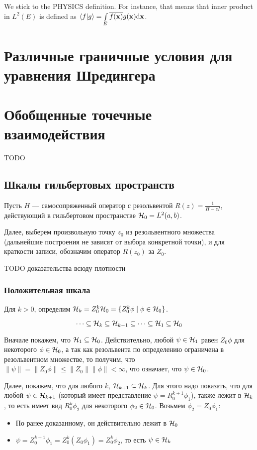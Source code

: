 We stick to the PHYSICS definition. For instance, that means that inner product in $L^2(E)$ is defined as $\ip{f}{g} = \int\limits_E \cconj{f(\vb{x})} g(\vb{x}) \dd \vb{x}$.

\section{Различные граничные условия для уравнения Шредингера}

\section{Обобщенные точечные взаимодействия}
TODO
\subsection{Шкалы гильбертовых пространств}
Пусть $H$ — самосопряженный оператор с резольвентой $R(z) = \frac{1}{H - z I}$, действующий в гильбертовом пространстве $\mathcal{H}_{0} = L^2(a, b)$.

Далее, выберем произвольную точку $z_0$ из резольвентного множества (дальнейшие построения не зависят от выбора конкретной точки), и для краткости записи, обозначим оператор $R(z_0)$ за $Z_0$.


TODO доказательства всюду плотности
\subsubsection{Положительная шкала}
Для $k > 0$, определим $\mathcal{H}_{k} = Z_0^k \mathcal{H}_{0} = \{ Z_0^k \phi \mid \phi \in \mathcal{H}_{0} \}$.

\begin{prop}
\[
\dots \subseteq \mathcal{H}_{k} \subseteq \mathcal{H}_{k - 1} \subseteq \dots \subseteq \mathcal{H}_{1} \subseteq{\mathcal{H}_{0}}
\]
\end{prop}
Вначале покажем, что $\mathcal{H}_{1} \subseteq \mathcal{H}_{0}$. Действительно, любой $\psi \in \mathcal{H}_{1}$ равен $Z_0 \phi$ для некоторого $\phi \in \mathcal{H}_{0}$, а так как резольвента по определению ограничена в резольвентном множестве, то получим, что $\| \psi \| = \| Z_0 \phi \| \le \|Z_0\| \|\phi\| < \infty$, что означает, что $\psi \in \mathcal{H}_{0}$.

Далее, покажем, что для любого $k$, $\mathcal{H}_{k + 1} \subseteq \mathcal{H}_{k}$. Для этого надо показать, что для любой $\psi \in \mathcal{H}_{k + 1}$ (который имеет представление $\psi = R_0^{k + 1} \phi_1$), также лежит в $\mathcal{H}_{k}$, то есть имеет вид $R_0^k \phi_2$ для некоторого $\phi_2 \in \mathcal{H}_{0}$. Возьмем $\phi_2 = Z_0 \phi_1$:
\begin{itemize}
\item По ранее доказанному, он действительно лежит в $\mathcal{H}_{0}$
\item $\psi = Z_0^{k + 1} \phi_1 = Z_0^k (Z_0 \phi_1) = Z_0^k \phi_2$, то есть $\psi \in \mathcal{H}_{k}$
\end{itemize}

